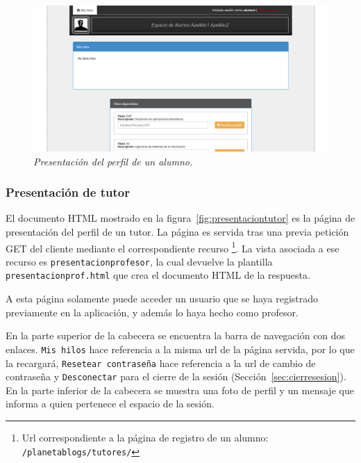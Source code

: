 \documentclass[a4paper, 12pt]{book}
\begin{document}
\begin{figure}
  \centering
  \includegraphics[width=17cm, keepaspectratio]{imagenes/PresentacionAlumno}
  \caption{\textit{Presentaci\'on del perfil de un alumno.}}
  \label{fig:presentacionalumno}
\end{figure}


\subsubsection{Presentaci\'on de tutor}
\label{sec:presentaciontutor}
El documento HTML mostrado en la figura~\ref{fig:presentaciontutor} es la p\'agina de presentaci\'on del perfil de un tutor. La p\'agina es servida 
tras una previa petici\'on GET del cliente mediante el correspondiente recurso \footnote{Url correspondiente a la p\'agina de registro de un alumno: 
\texttt{/planetablogs/tutores/}}. La vista asociada a ese recurso es \texttt{presentacionprofesor}, la cual devuelve la plantilla 
\texttt{presentacionprof.html} que crea el documento HTML de la respuesta.

A esta p\'agina solamente puede acceder un usuario que se haya registrado previamente en la aplicaci\'on, y adem\'as lo haya hecho como profesor.

En la parte superior de la cabecera se encuentra la barra de navegaci\'on con dos enlaces. \texttt{Mis hilos} hace referencia a la misma url de la 
p\'agina servida, por lo que la recargar\'a, \texttt{Resetear contrase\~na} hace referencia a la url de cambio de contrase\~na y \texttt{Desconectar} para el cierre de la sesi\'on (Secci\'on~\ref{sec:cierresesion}). En la parte inferior 
de la cabecera se muestra una foto de perfil y un mensaje que informa a quien pertenece el espacio de la sesi\'on.
\end{document}

